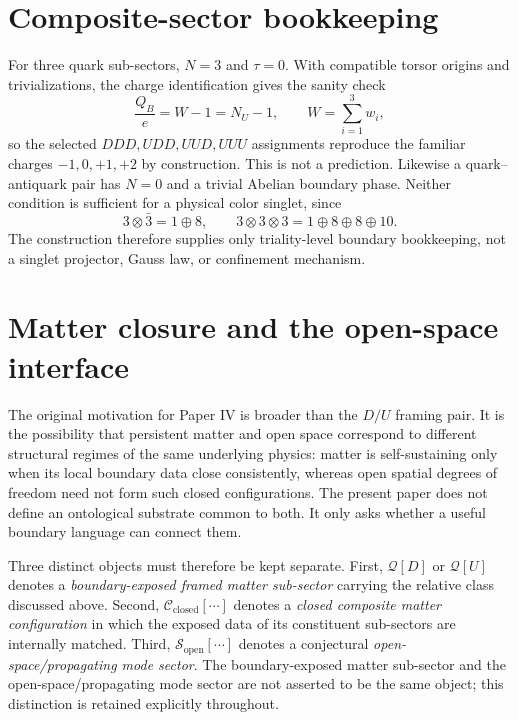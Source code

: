 \documentclass[aps,prd,reprint,superscriptaddress,nofootinbib,longbibliography,floatfix]{revtex4-2}
\newcommand{\Cclosed}{\mathcal{C}_{\mathrm{closed}}}
\newcommand{\Sopen}{\mathcal{S}_{\mathrm{open}}}
\begin{document}
\section{Composite-sector bookkeeping}
\label{sec:composites}

For three quark sub-sectors, $N=3$ and $\tau=0$. With compatible torsor origins and trivializations, the charge identification gives the sanity check
\begin{equation}
\frac{Q_B}{e}=W-1=N_U-1,
\qquad W=\sum_{i=1}^{3}w_i,
\label{eq:baryoncharge}
\end{equation}
so the selected $DDD,UDD,UUD,UUU$ assignments reproduce the familiar charges $-1,0,+1,+2$ by construction. This is not a prediction. Likewise a quark--antiquark pair has $N=0$ and a trivial Abelian boundary phase. Neither condition is sufficient for a physical color singlet, since
\begin{equation}
3\otimes\bar3=1\oplus8,
\qquad
3\otimes3\otimes3=1\oplus8\oplus8\oplus10.
\label{eq:colorproducts}
\end{equation}
The construction therefore supplies only triality-level boundary bookkeeping, not a singlet projector, Gauss law, or confinement mechanism.

\section{Matter closure and the open-space interface}
\label{sec:interface}

The original motivation for Paper IV is broader than the $D/U$ framing pair. It is the possibility that persistent matter and open space correspond to different structural regimes of the same underlying physics: matter is self-sustaining only when its local boundary data close consistently, whereas open spatial degrees of freedom need not form such closed configurations. The present paper does not define an ontological substrate common to both. It only asks whether a useful boundary language can connect them.

Three distinct objects must therefore be kept separate. First, $\mathcal Q[D]$ or $\mathcal Q[U]$ denotes a \emph{boundary-exposed framed matter sub-sector} carrying the relative class discussed above. Second, $\Cclosed[\cdots]$ denotes a \emph{closed composite matter configuration} in which the exposed data of its constituent sub-sectors are internally matched. Third, $\Sopen[\cdots]$ denotes a conjectural \emph{open-space/propagating mode sector}. The boundary-exposed matter sub-sector and the open-space/propagating mode sector are not asserted to be the same object; this distinction is retained explicitly throughout.
\end{document}
